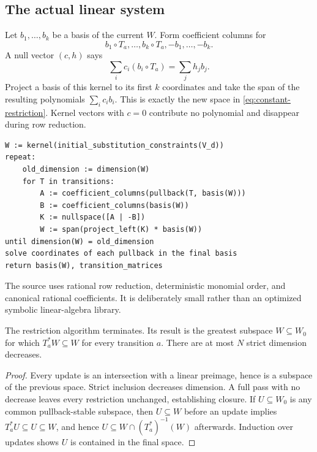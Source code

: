 \subsection{The actual linear system}
Let $b_1,\ldots,b_k$ be a basis of the current $W$. Form coefficient columns for
\[
 b_1\circ T_a,\ldots,b_k\circ T_a,-b_1,\ldots,-b_k.
\]
A null vector $(c,h)$ says
\[
 \sum_i c_i(b_i\circ T_a)=\sum_j h_j b_j.
\]
Project a basis of this kernel to its first $k$ coordinates and take the span
of the resulting polynomials $\sum_i c_i b_i$. This is exactly the new space in
\eqref{eq:constant-restriction}. Kernel vectors with $c=0$ contribute no
polynomial and disappear during row reduction.

\begin{lstlisting}
W := kernel(initial_substitution_constraints(V_d))
repeat:
    old_dimension := dimension(W)
    for T in transitions:
        A := coefficient_columns(pullback(T, basis(W)))
        B := coefficient_columns(basis(W))
        K := nullspace([A | -B])
        W := span(project_left(K) * basis(W))
until dimension(W) = old_dimension
solve coordinates of each pullback in the final basis
return basis(W), transition_matrices
\end{lstlisting}

The source uses rational row reduction, deterministic monomial order, and
canonical rational coefficients. It is deliberately small rather than an
optimized symbolic linear-algebra library.

\begin{theorem}
\label{thm:greatest-constant}
The restriction algorithm terminates. Its result is the greatest subspace
$W\subseteq W_0$ for which $T_a^*W\subseteq W$ for every transition $a$.
There are at most $N$ strict dimension decreases.
\end{theorem}
\begin{proof}
Every update is an intersection with a linear preimage, hence is a subspace of
the previous space. Strict inclusion decreases dimension. A full pass with no
decrease leaves every restriction unchanged, establishing closure.
If $U\subseteq W_0$ is any common pullback-stable subspace, then $U\subseteq W$
before an update implies $T_a^*U\subseteq U\subseteq W$, and hence
$U\subseteq W\cap(T_a^*)^{-1}(W)$ afterwards. Induction over updates shows
$U$ is contained in the final space.
\end{proof}

